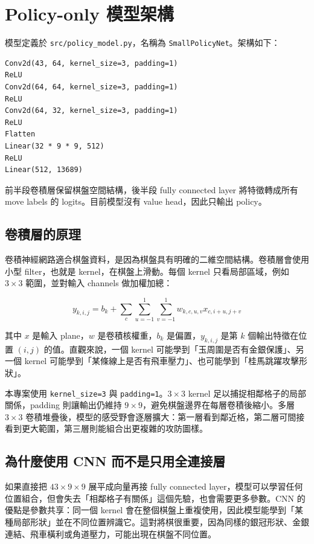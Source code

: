 \documentclass[12pt,a4paper,fontset=none]{ctexart}
\begin{document}
\section{Policy-only 模型架構}

模型定義於 \texttt{src/policy\_model.py}，名稱為 \texttt{SmallPolicyNet}。架構如下：

\begin{lstlisting}[style=cmd]
Conv2d(43, 64, kernel_size=3, padding=1)
ReLU
Conv2d(64, 64, kernel_size=3, padding=1)
ReLU
Conv2d(64, 32, kernel_size=3, padding=1)
ReLU
Flatten
Linear(32 * 9 * 9, 512)
ReLU
Linear(512, 13689)
\end{lstlisting}

前半段卷積層保留棋盤空間結構，後半段 fully connected layer 將特徵轉成所有 move labels 的 logits。目前模型沒有 value head，因此只輸出 policy。

\subsection{卷積層的原理}

卷積神經網路適合棋盤資料，是因為棋盤具有明確的二維空間結構。卷積層會使用小型 filter，也就是 kernel，在棋盤上滑動。每個 kernel 只看局部區域，例如 $3 \times 3$ 範圍，並對輸入 channels 做加權加總：

\[
y_{k,i,j}
=
b_k
+
\sum_c
\sum_{u=-1}^{1}
\sum_{v=-1}^{1}
w_{k,c,u,v}
x_{c,i+u,j+v}
\]

其中 $x$ 是輸入 plane，$w$ 是卷積核權重，$b_k$ 是偏置，$y_{k,i,j}$ 是第 $k$ 個輸出特徵在位置 $(i,j)$ 的值。直觀來說，一個 kernel 可能學到「玉周圍是否有金銀保護」、另一個 kernel 可能學到「某條線上是否有飛車壓力」、也可能學到「桂馬跳躍攻擊形狀」。

本專案使用 \texttt{kernel\_size=3} 與 \texttt{padding=1}。$3 \times 3$ kernel 足以捕捉相鄰格子的局部關係，padding 則讓輸出仍維持 $9 \times 9$，避免棋盤邊界在每層卷積後縮小。多層 $3 \times 3$ 卷積堆疊後，模型的感受野會逐層擴大：第一層看到鄰近格，第二層可間接看到更大範圍，第三層則能組合出更複雜的攻防圖樣。

\subsection{為什麼使用 CNN 而不是只用全連接層}

如果直接把 $43 \times 9 \times 9$ 展平成向量再接 fully connected layer，模型可以學習任何位置組合，但會失去「相鄰格子有關係」這個先驗，也會需要更多參數。CNN 的優點是參數共享：同一個 kernel 會在整個棋盤上重複使用，因此模型能學到「某種局部形狀」並在不同位置辨識它。這對將棋很重要，因為同樣的銀冠形狀、金銀連結、飛車橫利或角道壓力，可能出現在棋盤不同位置。
\end{document}
